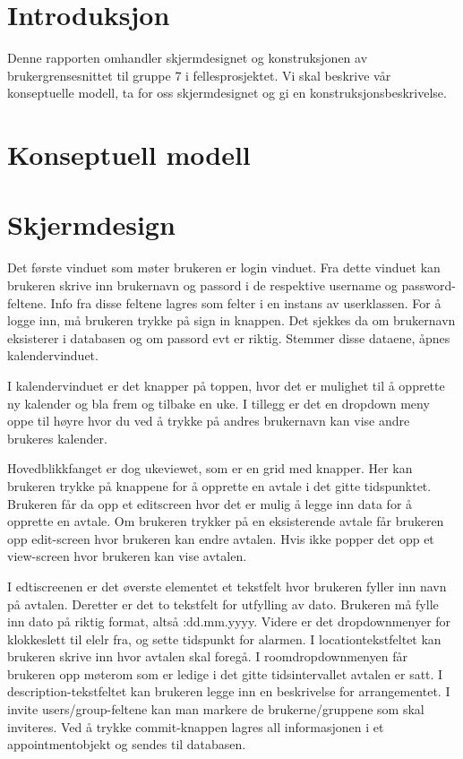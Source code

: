 \documentclass{article}
\begin{document}

\section{Introduksjon}
Denne rapporten omhandler skjermdesignet og konstruksjonen av brukergrensesnittet til gruppe 7 i fellesprosjektet. Vi skal beskrive vår konseptuelle modell, ta for oss skjermdesignet og gi en konstruksjonsbeskrivelse. 

\section{Konseptuell modell}



\section{Skjermdesign}
Det første vinduet som møter brukeren er login vinduet. Fra dette vinduet kan brukeren skrive inn brukernavn og passord i de respektive username og password-feltene. Info fra disse feltene lagres som felter i en instans av userklassen. For å logge inn, må brukeren trykke på sign in knappen. Det sjekkes da om brukernavn eksisterer i databasen og om passord evt er riktig. Stemmer disse dataene, åpnes kalendervinduet.

I kalendervinduet er det knapper på toppen, hvor det er mulighet til å opprette ny kalender og bla frem og tilbake en uke. I tillegg er det en dropdown meny oppe til høyre hvor du ved å trykke på andres brukernavn kan vise andre brukeres kalender.

Hovedblikkfanget er dog ukeviewet, som er en grid med knapper. Her kan brukeren trykke på knappene for å opprette en avtale i det gitte tidspunktet. Brukeren får da opp et editscreen hvor det er mulig å legge inn data for å opprette en avtale. Om brukeren trykker på en eksisterende avtale får brukeren opp edit-screen hvor brukeren kan endre avtalen. Hvis ikke popper det opp et view-screen hvor brukeren kan vise avtalen.

I edtiscreenen er det øverste elementet et tekstfelt hvor brukeren fyller inn navn på avtalen. Deretter er det to tekstfelt for utfylling av dato. Brukeren må fylle inn dato på riktig format, altså :dd.mm.yyyy. Videre er det dropdownmenyer for klokkeslett til elelr fra, og sette tidspunkt for alarmen. I locationtekstfeltet kan brukeren skrive inn hvor avtalen skal foregå. I roomdropdownmenyen får brukeren opp møterom som er ledige i det gitte tidsintervallet avtalen er satt. I description-tekstfeltet kan brukeren legge inn en beskrivelse for arrangementet. I invite users/group-feltene kan man markere de brukerne/gruppene som skal inviteres. Ved å trykke commit-knappen  lagres all informasjonen i et appointmentobjekt og sendes til databasen.
\end{document}
